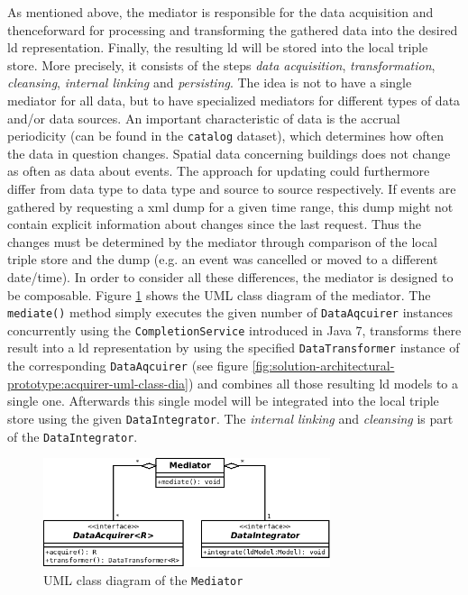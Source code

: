 \documentclass[draft,final]{vutinfth} %
\begin{document}
As mentioned above, the mediator is responsible for the data acquisition and thenceforward for processing and transforming the gathered data into the desired \gls{ld} representation. Finally, the resulting \gls{ld} will be stored into the local triple store. More precisely, it consists of the steps \textit{data acquisition}, \textit{transformation}, \textit{cleansing}, \textit{internal linking} and \textit{persisting}. The idea is not to have a single mediator for all data, but to have specialized mediators for different types of data and/or data sources. An important characteristic of data is the accrual periodicity (can be found in the \texttt{catalog} dataset), which determines how often the data in question changes. Spatial data concerning buildings does not change as often as data about events. The approach for updating could furthermore differ from data type to data type and source to source respectively. If events are gathered by requesting a \gls{xml} dump for a given time range, this dump might not contain explicit information about changes since the last request. Thus the changes must be determined by the mediator through comparison of the local triple store and the dump (e.g. an event was cancelled or moved to a different date/time). In order to consider all these differences, the mediator is designed to be composable. Figure \ref{fig:solution-architectural-prototype:mediator-uml-class-dia} shows the UML class diagram of the mediator. The \texttt{mediate()} method simply executes the given number of \texttt{DataAqcuirer} instances concurrently using the \texttt{CompletionService} introduced in Java 7, transforms there result into a \gls{ld} representation by using the specified \texttt{DataTransformer} instance of the corresponding \texttt{DataAqcuirer} (see figure \ref{fig:solution-architectural-prototype:acquirer-uml-class-dia}) and combines all those resulting \gls{ld} models to a single one. Afterwards this single model will be integrated into the local triple store using the given \texttt{DataIntegrator}. The \textit{internal linking} and \textit{cleansing} is part of the \texttt{DataIntegrator}.

\begin{figure}[h]
    \centering
    \includegraphics[width=0.75\textwidth]{graphics/solution/architecture/mediator.png}
    \caption{UML class diagram of the \texttt{Mediator}}
    \label{fig:solution-architectural-prototype:mediator-uml-class-dia}
\end{figure}
\end{document}
